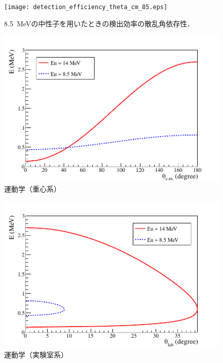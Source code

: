 \documentclass[../master]{subfiles}
\begin{document}
\begin{figure}
  \centering
  \texttt{[image: detection\_efficiency\_theta\_cm\_85.eps]}
  \caption{\SI{8.5}{\mega\electronvolt}の中性子を用いたときの検出効率の散乱角依存性．}
  \label{fig::detection_efficiency_theta_cm_low}
\end{figure}
\begin{figure}
  \centering
  \includegraphics[clip, width=0.8\columnwidth]{../pdf/kinema_cm.pdf}
  \caption{運動学（重心系）}
  \label{fig::kinema_cm}
\end{figure}
\begin{figure}
  \centering
  \includegraphics[clip, width=0.8\columnwidth]{../pdf/kinema_lab.pdf}
  \caption{運動学（実験室系）}
  \label{fig::kinema_lab}
\end{figure}
\end{document}
